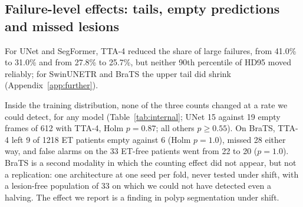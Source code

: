 \subsection{Failure-level effects: tails, empty predictions and missed lesions}
\label{sec:res-failures}
For UNet and SegFormer, TTA-4 reduced the share of large failures, from 41.0\% to 31.0\% and from 27.8\% to 25.7\%, but neither 90th percentile of HD95 moved reliably; for SwinUNETR and BraTS the upper tail did shrink (Appendix~\ref{app:further}).

Inside the training distribution, none of the three counts changed at a rate we could detect, for any model (Table~\ref{tab:internal}; UNet 15 against 19 empty frames of 612 with TTA-4, Holm $p=0.87$; all others $p\geq0.55$). On BraTS, TTA-4 left 9 of 1218 ET patients empty against 6 (Holm $p=1.0$), missed 28 either way, and false alarms on the 33 ET-free patients went from 22 to 20 ($p=1.0$). BraTS is a second modality in which the counting effect did not appear, but not a replication: one architecture at one seed per fold, never tested under shift, with a lesion-free population of 33 on which we could not have detected even a halving. The effect we report is a finding in polyp segmentation under shift.

